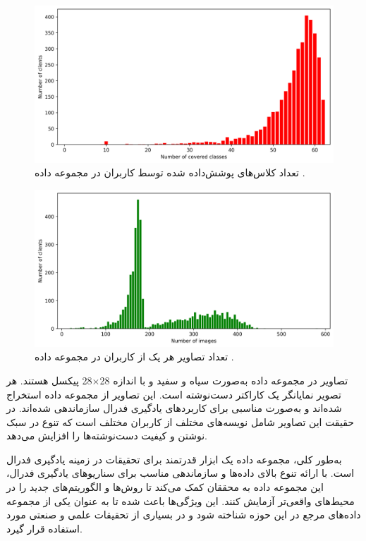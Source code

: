 \begin{figure}[t]
	\centering
	\includegraphics[scale=0.7]{images/chap5/clients_cover_classes.png}%
	\caption{%
تعداد کلاس‌های پوشش‌داده شده توسط کاربران در مجموعه داده
		.
	}
	\label{clients_cover_classes}
	\centering
\end{figure}


\begin{figure}[t!]
	\centering
	\includegraphics[scale=0.7]{images/chap5/clients_images.png}%
	\caption{%
		تعداد تصاویر هر یک از کاربران در مجموعه داده
		.
	}
	\label{clients_images}
	\centering
\end{figure}



تصاویر در مجموعه داده
به‌صورت سیاه و سفید و با اندازه
28$\times$28
پیکسل هستند. هر تصویر نمایانگر یک کاراکتر دست‌نوشته است. این تصاویر از مجموعه داده
استخراج شده‌اند و به‌صورت مناسبی برای کاربردهای یادگیری فدرال سازماندهی شده‌اند. در حقیقت این تصاویر شامل نویسه‌های مختلف از کاربران مختلف است که تنوع در سبک نوشتن و کیفیت دست‌نوشته‌ها را افزایش می‌دهد.


به‌طور کلی، مجموعه داده
یک ابزار قدرتمند برای تحقیقات در زمینه یادگیری فدرال است. با ارائه تنوع بالای داده‌ها و سازماندهی مناسب برای سناریوهای یادگیری فدرال، این مجموعه داده به محققان کمک می‌کند تا روش‌ها و الگوریتم‌های جدید را در محیط‌های واقعی‌تر آزمایش کنند. این ویژگی‌ها باعث شده تا
به عنوان یکی از مجموعه داده‌های مرجع در این حوزه شناخته شود و در بسیاری از تحقیقات علمی و صنعتی مورد استفاده قرار گیرد.



